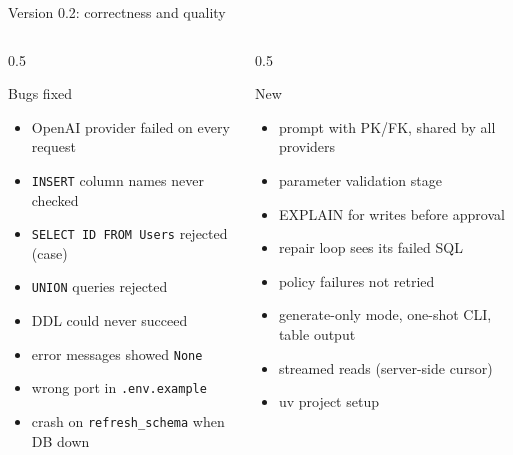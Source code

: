 \documentclass[aspectratio=169,10pt]{beamer}
\begin{document}
\begin{frame}{Version 0.2: correctness and quality}
  \footnotesize
  \begin{columns}[T]
    \begin{column}{0.5\textwidth}
      \begin{block}{Bugs fixed}
        \begin{itemize}
          \item OpenAI provider failed on every request
          \item \texttt{INSERT} column names never checked
          \item \texttt{SELECT ID FROM Users} rejected (case)
          \item \texttt{UNION} queries rejected
          \item DDL could never succeed
          \item error messages showed \texttt{None}
          \item wrong port in \texttt{.env.example}
          \item crash on \texttt{refresh\_schema} when DB down
        \end{itemize}
      \end{block}
    \end{column}
    \begin{column}{0.5\textwidth}
      \begin{block}{New}
        \begin{itemize}
          \item prompt with PK/FK, shared by all providers
          \item parameter validation stage
          \item EXPLAIN for writes before approval
          \item repair loop sees its failed SQL
          \item policy failures not retried
          \item generate-only mode, one-shot CLI, table output
          \item streamed reads (server-side cursor)
          \item uv project setup
        \end{itemize}
      \end{block}
    \end{column}
  \end{columns}
\end{frame}
\end{document}
